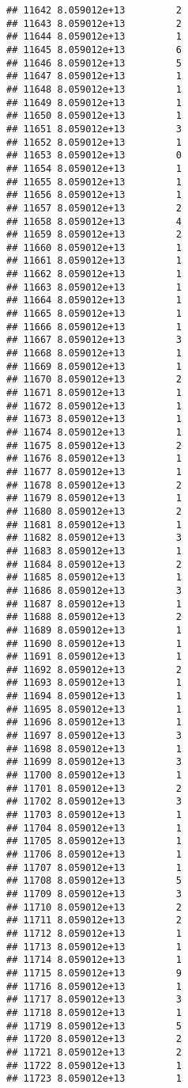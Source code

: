 \documentclass[
]{article}
\begin{document}
\begin{verbatim}
## 11642 8.059012e+13         2
## 11643 8.059012e+13         2
## 11644 8.059012e+13         1
## 11645 8.059012e+13         6
## 11646 8.059012e+13         5
## 11647 8.059012e+13         1
## 11648 8.059012e+13         1
## 11649 8.059012e+13         1
## 11650 8.059012e+13         1
## 11651 8.059012e+13         3
## 11652 8.059012e+13         1
## 11653 8.059012e+13         0
## 11654 8.059012e+13         1
## 11655 8.059012e+13         1
## 11656 8.059012e+13         1
## 11657 8.059012e+13         2
## 11658 8.059012e+13         4
## 11659 8.059012e+13         2
## 11660 8.059012e+13         1
## 11661 8.059012e+13         1
## 11662 8.059012e+13         1
## 11663 8.059012e+13         1
## 11664 8.059012e+13         1
## 11665 8.059012e+13         1
## 11666 8.059012e+13         1
## 11667 8.059012e+13         3
## 11668 8.059012e+13         1
## 11669 8.059012e+13         1
## 11670 8.059012e+13         2
## 11671 8.059012e+13         1
## 11672 8.059012e+13         1
## 11673 8.059012e+13         1
## 11674 8.059012e+13         1
## 11675 8.059012e+13         2
## 11676 8.059012e+13         1
## 11677 8.059012e+13         1
## 11678 8.059012e+13         2
## 11679 8.059012e+13         1
## 11680 8.059012e+13         2
## 11681 8.059012e+13         1
## 11682 8.059012e+13         3
## 11683 8.059012e+13         1
## 11684 8.059012e+13         2
## 11685 8.059012e+13         1
## 11686 8.059012e+13         3
## 11687 8.059012e+13         1
## 11688 8.059012e+13         2
## 11689 8.059012e+13         1
## 11690 8.059012e+13         1
## 11691 8.059012e+13         1
## 11692 8.059012e+13         2
## 11693 8.059012e+13         1
## 11694 8.059012e+13         1
## 11695 8.059012e+13         1
## 11696 8.059012e+13         1
## 11697 8.059012e+13         3
## 11698 8.059012e+13         1
## 11699 8.059012e+13         3
## 11700 8.059012e+13         1
## 11701 8.059012e+13         2
## 11702 8.059012e+13         3
## 11703 8.059012e+13         1
## 11704 8.059012e+13         1
## 11705 8.059012e+13         1
## 11706 8.059012e+13         1
## 11707 8.059012e+13         1
## 11708 8.059012e+13         5
## 11709 8.059012e+13         3
## 11710 8.059012e+13         2
## 11711 8.059012e+13         2
## 11712 8.059012e+13         1
## 11713 8.059012e+13         1
## 11714 8.059012e+13         1
## 11715 8.059012e+13         9
## 11716 8.059012e+13         1
## 11717 8.059012e+13         3
## 11718 8.059012e+13         1
## 11719 8.059012e+13         5
## 11720 8.059012e+13         2
## 11721 8.059012e+13         2
## 11722 8.059012e+13         1
## 11723 8.059012e+13         1

\end{verbatim}
\end{document}
